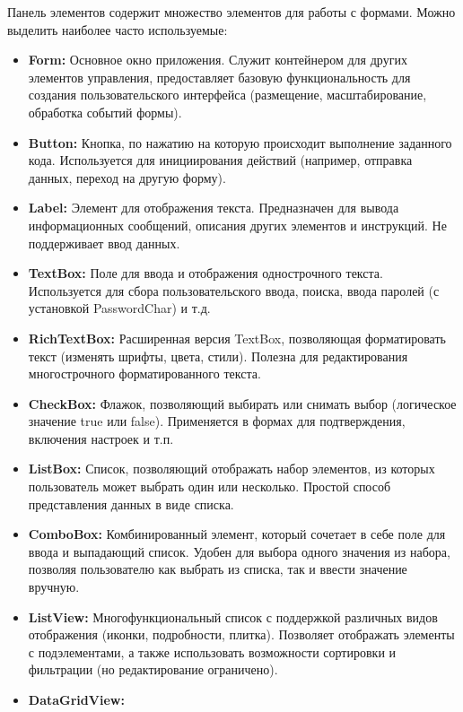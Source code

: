 \documentclass[12pt]{article}
\renewcommand{\texttt}[1]{{\small\ttfamily #1}}
\numberwithin{listing}{section}
\numberwithin{figure}{section}
\begin{document}
Панель элементов содержит множество элементов для работы с формами.
Можно выделить наиболее часто используемые:
\begin{itemize}
	\item \textbf{\texttt{Form:}}
	      Основное окно приложения. Служит контейнером для других элементов управления, предоставляет базовую функциональность для создания пользовательского интерфейса (размещение, масштабирование, обработка событий формы).
	\item \textbf{\texttt{Button:}}
	      Кнопка, по нажатию на которую происходит выполнение заданного кода. Используется для инициирования действий (например, отправка данных, переход на другую форму).
	\item \textbf{\texttt{Label:}}
	      Элемент для отображения текста. Предназначен для вывода информационных сообщений, описания других элементов и инструкций. Не поддерживает ввод данных.
	\item \textbf{\texttt{TextBox:}}
	      Поле для ввода и отображения однострочного текста. Используется для сбора пользовательского ввода, поиска, ввода паролей (с установкой \texttt{PasswordChar}) и т.д.
	\item \textbf{\texttt{RichTextBox:}}
	      Расширенная версия \texttt{TextBox}, позволяющая форматировать текст (изменять шрифты, цвета, стили). Полезна для редактирования многострочного форматированного текста.
	\item \textbf{\texttt{CheckBox:}}
	      Флажок, позволяющий выбирать или снимать выбор (логическое значение \texttt{true} или \texttt{false}). Применяется в формах для подтверждения, включения настроек и т.п.
	\item \textbf{\texttt{ListBox:}}
	      Список, позволяющий отображать набор элементов, из которых пользователь может выбрать один или несколько. Простой способ представления данных в виде списка.
	\item \textbf{\texttt{ComboBox:}}
	      Комбинированный элемент, который сочетает в себе поле для ввода и выпадающий список. Удобен для выбора одного значения из набора, позволяя пользователю как выбрать из списка, так и ввести значение вручную.
	\item \textbf{\texttt{ListView:}}
	      Многофункциональный список с поддержкой различных видов отображения (иконки, подробности, плитка). Позволяет отображать элементы с подэлементами, а также использовать возможности сортировки и фильтрации (но редактирование ограничено).
	\item \textbf{\texttt{DataGridView:}}

\end{itemize}
\end{document}
